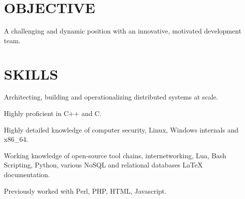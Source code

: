 \documentclass[margin]{res}
\begin{document}

\address{david.andrews112@gmail.com \ \ \ (949) 633-0588}



\begin{resume}

\section{OBJECTIVE}
A challenging and dynamic position with an innovative, motivated development team.


\section{SKILLS}
\begin{list}{}{\leftmargin=0em \topsep=0pt \partopsep=0pt \parsep=2.5pt}
  \item Architecting, building and operationalizing distributed systems at scale.
  \item Highly proficient in C++ and C.
  \item Highly detailed knowledge of computer security, Linux, Windows internals and x86\_64.
  \item Working knowledge of open-source tool chains, internetworking,
    Lua, Bash Scripting, Python, various NoSQL and relational databases \LaTeX{} documentation.
  \item Previously worked with Perl, PHP, HTML, Javascript.
\end{list}






\end{resume}
\end{document}
